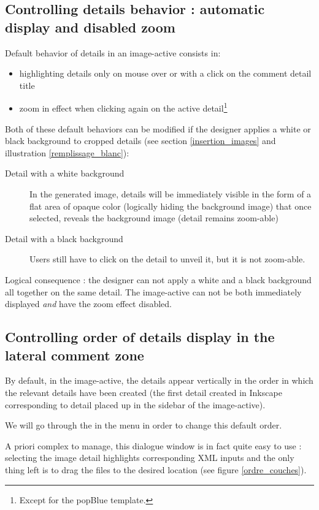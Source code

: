 \subsection{Controlling details behavior : automatic display and disabled zoom}
\label{couche_XML}

Default behavior of details in an image-active consists in:
\begin{itemize}
 \item highlighting details only on mouse over or with a click on the comment 
 detail title
 \item zoom in effect when clicking again on the active detail\footnote{Except 
 for the popBlue template.}
\end{itemize}

Both of these default behaviors can be modified if the designer applies a white
 or black background to cropped details (see section 
\ref{insertion_images} 
 and illustration 
\ref{remplissage_blanc}):
\begin{description}
 \item [Detail with a white background] In the generated image, details will be
 immediately visible in the form of a flat area of opaque color (logically hiding the background image) that once selected, reveals the background image (detail remains zoom-able)
 \item [Detail with a black background] Users still have to click on the detail to unveil it, but it is not zoom-able.
\end{description}

Logical consequence : the designer can not apply a white and a black
background all together on the same detail. The image-active can not be 
both immediately displayed \textit{and} have the zoom effect disabled.

\subsection{Controlling order of details display in the lateral comment zone}

By default, in the image-active, the details appear vertically in the order in which the relevant details have been created (the first detail created in Inkscape corresponding to detail placed up in the sidebar of the image-active).

We will go through the  in the  menu in order to change this default order.

A priori complex to manage, this dialogue window is in fact quite easy to use : selecting the image detail highlights corresponding XML inputs and the only thing left is to drag the files to the desired location (see figure \ref{ordre_couches}).

